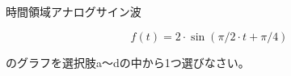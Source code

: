 時間領域アナログサイン波

\[
f(t) = 2 \cdot \sin( \pi/2 \cdot t + \pi/4 )
\]

\bigskip
\noindent  のグラフを選択肢a〜dの中から1つ選びなさい。
